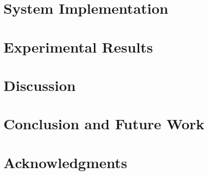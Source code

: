 \documentclass{article}
\begin{document}
\section{System Implementation}

\section{Experimental Results}

\section{Discussion}

\section{Conclusion and Future Work}

\section{Acknowledgments}




\end{document}
